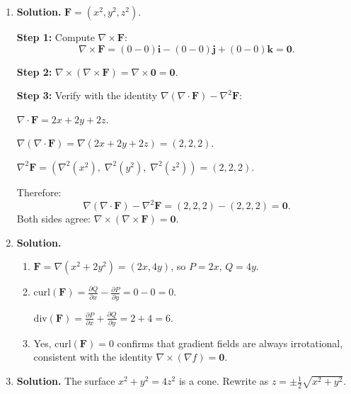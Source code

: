 \begin{enumerate}
To verify, use the Divergence Theorem on a sphere $S$ of radius $R$:
\[
\oiint_S \mathbf{F}\cdot\mathbf{n}\,dS = \iiint_V \nabla\cdot\mathbf{F}\,dV = \iiint_V 3\,dV = 3\cdot\frac{4}{3}\pi R^3 = 4\pi R^3.
\]
The total outward flux through the sphere is $4\pi R^3$, which grows with the volume, confirming the uniform source interpretation.

\item \textbf{Solution.}
$\mathbf{F}=(x^2, y^2, z^2)$.

\textbf{Step 1:} Compute $\nabla\times\mathbf{F}$:
\[
\nabla\times\mathbf{F} = (0-0)\mathbf{i}-(0-0)\mathbf{j}+(0-0)\mathbf{k} = \mathbf{0}.
\]

\textbf{Step 2:} $\nabla\times(\nabla\times\mathbf{F}) = \nabla\times\mathbf{0} = \mathbf{0}$.

\textbf{Step 3:} Verify with the identity $\nabla(\nabla\cdot\mathbf{F})-\nabla^2\mathbf{F}$:

$\nabla\cdot\mathbf{F} = 2x+2y+2z$.

$\nabla(\nabla\cdot\mathbf{F}) = \nabla(2x+2y+2z)=(2,2,2)$.

$\nabla^2\mathbf{F} = (\nabla^2(x^2),\;\nabla^2(y^2),\;\nabla^2(z^2)) = (2,2,2)$.

Therefore:
\[
\nabla(\nabla\cdot\mathbf{F})-\nabla^2\mathbf{F} = (2,2,2)-(2,2,2)=\mathbf{0}.
\]
Both sides agree: $\nabla\times(\nabla\times\mathbf{F})=\mathbf{0}$.

\item \textbf{Solution.}
\begin{enumerate}
\item $\mathbf{F}=\nabla(x^2+2y^2) = (2x, 4y)$, so $P=2x$, $Q=4y$.

\item $\text{curl}(\mathbf{F}) = \frac{\partial Q}{\partial x}-\frac{\partial P}{\partial y} = 0 - 0 = \boxed{0}$.

$\text{div}(\mathbf{F}) = \frac{\partial P}{\partial x}+\frac{\partial Q}{\partial y} = 2+4 = \boxed{6}$.

\item Yes, $\text{curl}(\mathbf{F})=0$ confirms that gradient fields are always irrotational, consistent with the identity $\nabla\times(\nabla f)=\mathbf{0}$.
\end{enumerate}

\item \textbf{Solution.}
The surface $x^2+y^2=4z^2$ is a cone. Rewrite as $z = \pm\frac{1}{2}\sqrt{x^2+y^2}$.


\end{enumerate}
